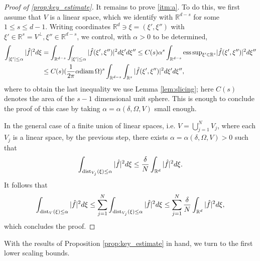 \documentclass[a4paper, 10pt, twoside, notitlepage]{amsart}
\theoremstyle{plain}
\newcommand{\R}{\mathbb{R}}
\newcommand{\diam}{\textup{diam}}
\begin{document}
		\begin{proof}[Proof of \cref{prop:key_estimate}]
			It remains to prove \ref{itm:a}. To do this, we first assume that $V$ is a linear space, which we identify with $\R^{d-s}$ for some $1\leq s\leq d-1$. Writing coordinates
			$\R^d\ni\xi=(\xi',\xi'')$ with $\xi'\in\R^s = V^\perp, \xi'' \in \R^{d-s}$, we control, with $\alpha>0$ to be determined,
			\begin{align*}
				\int_{|\xi'|\leq \alpha}|\hat f|^2d\xi&=\int_{\R^{d-s}}\int_{|\xi'|\leq \alpha}|\hat f(\xi',\xi'')|^2 d\xi'd\xi''\leq C(s)\alpha^s\int_{\R^{d-s}}\mathrm{ess\,sup}_{\xi' \in\R^s}|\hat f(\xi',\xi'')|^2 d\xi''\\
				&\leq C(s)(\frac{1}{2\pi} \alpha\diam\,\Omega)^s\int_{\R^{d-s}}\int_{\R^s}|\hat f(\xi',\xi'')|^2d\xi' d\xi'',
			\end{align*}
			where to obtain the last inequality we use Lemma \ref{lem:slicing}; here $C(s)$ denotes the area of the $s-1$ dimensional unit sphere.  This is enough to conclude the proof of this case by
			taking $\alpha = \alpha(\delta,\Omega,V)$ small enough.
			
			In the general case of a finite union of linear spaces, i.e. $V=\bigcup_{j=1}^NV_j$, where each $V_j$ is a linear space, by the previous step, there exists $\alpha = \alpha(\delta,\Omega,V)>0$ such that
			$$
			\int_{\dist_{V_j}(\xi)\leq \alpha}|\hat f|^2d\xi\leq \frac{\delta}{N}\int_{\R^d}|\hat f|^2d\xi.
			$$
			It follows that
			$$
			\int_{\dist_V(\xi)\leq \alpha}|\hat f|^2d\xi\leq \sum_{j=1}^N \int_{\dist_{V_j}(\xi)\leq \alpha}|\hat f|^2d\xi\leq \sum_{j=1}^N \frac{\delta}{N}\int_{\R^d}|\hat f|^2d\xi,
			$$
			which concludes the proof.
		\end{proof}
	
With the results of Proposition \ref{prop:key_estimate} in hand, we turn to the first lower scaling bounds.		
		
\end{document}
